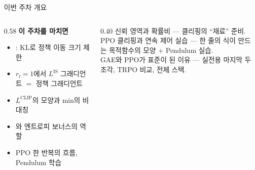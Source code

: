 \begin{frame}{이번 주차 개요}
  \small
  \begin{columns}[T]
    \begin{column}{0.58\textwidth}
      \textbf{이 주차를 마치면}
      \begin{itemize}
        \item {}: KL로 정책 이동 크기 제한
        \item $r_t=1$에서 $L^{\mathrm{IS}}$ 그래디언트 $=$ 정책 그래디언트
        \item $L^{\mathrm{CLIP}}$의 모양과 min의 비대칭
        \item {}와 엔트로피 보너스의 역할
        \item PPO 한 반복의 흐름, Pendulum 학습
      \end{itemize}
    \end{column}
    \begin{column}{0.40\textwidth}
       신뢰 영역과 확률비 — 클리핑의 ``재료'' 준비.
      \\[0.5em]
       PPO 클리핑과 연속 제어 실습 — 한 줄의 식이 만드는
      목적함수의 모양 + Pendulum 실습.
      \\[0.5em]
       GAE와 PPO가 표준이 된 이유 — 실전용 마지막 두 조각,
      TRPO 비교, 전체 스택.
    \end{column}
  \end{columns}
\end{frame}
